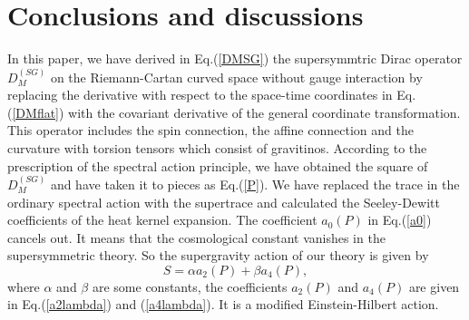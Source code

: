 \documentclass{ptephy}%
\begin{document}
\section{Conclusions and discussions}
In this paper, we have derived in Eq.(\ref{DMSG}) the supersymmtric Dirac operator $D_M^{(SG)}$  
on the Riemann-Cartan curved space without gauge interaction by replacing the derivative with respect to 
the space-time coordinates in Eq.(\ref{DMflat}) with the covariant derivative of the general coordinate transformation. 
This operator includes the spin connection, 
the affine connection and the curvature with torsion tensors which consist of gravitinos. According to the 
prescription of the spectral action principle, we have obtained the square of $D_M^{(SG)}$ and 
have taken it to pieces as Eq.(\ref{P}). 
We have replaced the trace in the ordinary spectral action with the supertrace and calculated the Seeley-Dewitt coefficients  
of the heat kernel expansion. The coefficient $a_0(P)$ in Eq.(\ref{a0}) cancels out. 
It means that the cosmological constant vanishes in the supersymmetric theory. 
So the supergravity action of our theory is given by
\begin{equation}
S = \alpha a_2(P) + \beta a_4(P), \label{sugraaction}
\end{equation}
where $\alpha$ and $\beta$ are some constants, the coefficients $a_2(P)$ and $a_4(P)$ are given 
in Eq.(\ref{a2lambda}) and (\ref{a4lambda}). It is a modified Einstein-Hilbert action. 
\end{document}
